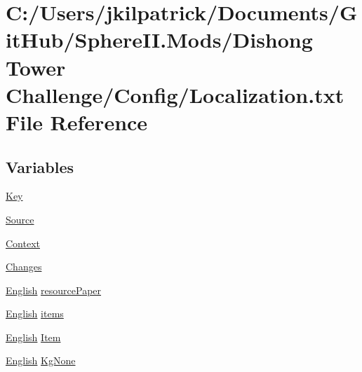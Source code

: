 \hypertarget{_dishong_01_tower_01_challenge_2_config_2_localization_8txt}{}\section{C\+:/\+Users/jkilpatrick/\+Documents/\+Git\+Hub/\+Sphere\+II.Mods/\+Dishong Tower Challenge/\+Config/\+Localization.txt File Reference}
\label{_dishong_01_tower_01_challenge_2_config_2_localization_8txt}
\subsection*{Variables}
\begin{DoxyCompactItemize}
\item 
\mbox{\hyperlink{_dishong_01_tower_01_challenge_2_config_2_localization_8txt_ab3c7af4820830f9166ede9e5623c4e73}{Key}}
\item 
\mbox{\hyperlink{_dishong_01_tower_01_challenge_2_config_2_localization_8txt_a176e1eca2d1e3d1c6a064340bc6a351e}{Source}}
\item 
\mbox{\hyperlink{_dishong_01_tower_01_challenge_2_config_2_localization_8txt_abbebfae2c8b3c06e3115e79965277840}{Context}}
\item 
\mbox{\hyperlink{_dishong_01_tower_01_challenge_2_config_2_localization_8txt_aada75e543d2eadaa69533d17cac8bd9a}{Changes}}
\item 
\mbox{\hyperlink{_sphere_i_i_01_winter_01_project_2_config_2_localization_8txt_ad896b63205779b1b09e86d941ce13976}{English}} \mbox{\hyperlink{_dishong_01_tower_01_challenge_2_config_2_localization_8txt_a377816a60654699f149f7cef3da74d15}{resource\+Paper}}
\item 
\mbox{\hyperlink{_sphere_i_i_01_winter_01_project_2_config_2_localization_8txt_ad896b63205779b1b09e86d941ce13976}{English}} \mbox{\hyperlink{_dishong_01_tower_01_challenge_2_config_2_localization_8txt_ac9f63106d69e66a57567394d6c03cba2}{items}}
\item 
\mbox{\hyperlink{_sphere_i_i_01_winter_01_project_2_config_2_localization_8txt_ad896b63205779b1b09e86d941ce13976}{English}} \mbox{\hyperlink{_dishong_01_tower_01_challenge_2_config_2_localization_8txt_ad20ef489e72c75650a4330cf262851b5}{Item}}
\item 
\mbox{\hyperlink{_sphere_i_i_01_winter_01_project_2_config_2_localization_8txt_ad896b63205779b1b09e86d941ce13976}{English}} \mbox{\hyperlink{_dishong_01_tower_01_challenge_2_config_2_localization_8txt_acc1c43e0980c5828bcfaf85313744919}{Kg\+None}}

\end{DoxyCompactItemize}
